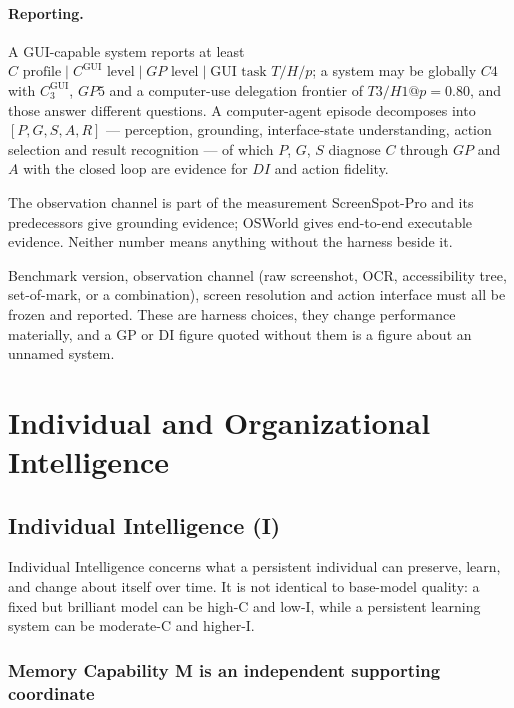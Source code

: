 \paragraph{Reporting.} A GUI-capable system reports at least $C \text{ profile} \mid C^{\mathrm{GUI}} \text{ level} \mid GP \text{ level} \mid \text{GUI task } T/H/p$; a system may be globally $C4$ with $C^{\mathrm{GUI}}_3$, $GP5$ and a computer-use delegation frontier of $T3/H1@p{=}0.80$, and those answer different questions. A computer-agent episode decomposes into $[P, G, S, A, R]$ --- perception, grounding, interface-state understanding, action selection and result recognition --- of which $P$, $G$, $S$ diagnose $C$ through $GP$ and $A$ with the closed loop are evidence for $DI$ and action fidelity.

\begin{cautionbox}{The observation channel is part of the measurement}
ScreenSpot-Pro \citep{li2025screenspotpro} and its predecessors give grounding evidence; OSWorld \citep{xie2024osworld} gives end-to-end executable evidence. Neither number means anything without the harness beside it.

Benchmark version, observation channel (raw screenshot, OCR, accessibility tree, set-of-mark, or a combination), screen resolution and action interface must all be frozen and reported. These are harness choices, they change performance materially, and a GP or DI figure quoted without them is a figure about an unnamed system.
\end{cautionbox}

\section{Individual and Organizational Intelligence}

\subsection{Individual Intelligence (I)}\label{sec:memory}

Individual Intelligence concerns what a persistent individual can preserve, learn, and change about itself over time. It is not identical to base-model quality: a fixed but brilliant model can be high-C and low-I, while a persistent learning system can be moderate-C and higher-I.

\subsubsection{Memory Capability M is an independent supporting coordinate}

